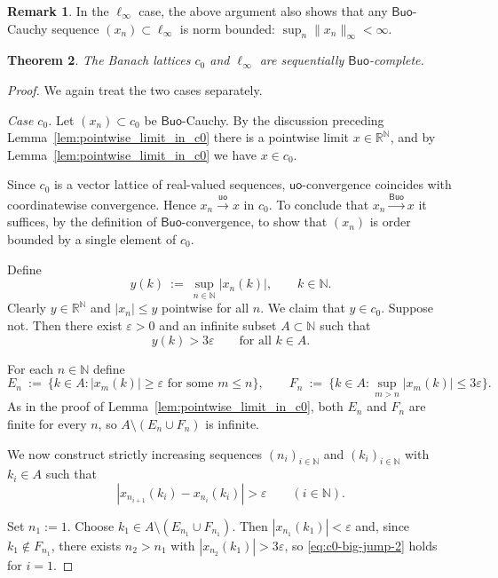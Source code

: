 \documentclass[11pt]{amsart}
\newtheorem{theorem}{Theorem}[section]
\theoremstyle{definition}
\newtheorem{remark}[theorem]{Remark}
\newcommand{\R}{\mathbb{R}}
\newcommand{\N}{\mathbb{N}}
\newcommand{\uo}{\ensuremath{\mathsf{uo}}}
\newcommand{\Buo}{\ensuremath{\mathsf{Buo}}}
\renewcommand{\le}{\leqslant}
\renewcommand{\ge}{\geqslant}
\begin{document}
\begin{remark}
In the $\ell_\infty$ case, the above argument also shows that any
\Buo-Cauchy sequence $(x_n)\subset\ell_\infty$ is norm bounded:
$\sup_n\|x_n\|_\infty<\infty$.
\end{remark}

\begin{theorem}\label{thm:c0-complete}
The Banach lattices $c_0$ and $\ell_\infty$ are sequentially \Buo-complete.
\end{theorem}

\begin{proof}
We again treat the two cases separately.

\emph{Case $c_0$.}
Let $(x_n)\subset c_0$ be \Buo-Cauchy.  By the discussion preceding
Lemma~\ref{lem:pointwise_limit_in_c0} there is a pointwise limit
$x\in\R^\N$, and by Lemma~\ref{lem:pointwise_limit_in_c0} we have $x\in c_0$.

Since $c_0$ is a vector lattice of real-valued sequences, $\uo$-convergence
coincides with coordinatewise convergence.  Hence $x_n\xrightarrow{\uo}x$
in $c_0$.  To conclude that $x_n\xrightarrow{\Buo}x$ it suffices, by the
definition of \Buo-convergence, to show that $(x_n)$ is order bounded by a
single element of $c_0$.

Define
\[
y(k)\ :=\ \sup_{n\in\N}|x_n(k)|,\qquad k\in\N.
\]
Clearly $y\in\R^\N$ and $|x_n|\le y$ pointwise for all $n$.  We claim that
$y\in c_0$.  Suppose not.  Then there exist $\varepsilon>0$ and an infinite
subset $A\subset\N$ such that
\[
y(k)>3\varepsilon\qquad\text{for all }k\in A.
\]

For each $n\in\N$ define
\[
E_n\ :=\ \bigl\{k\in A: |x_m(k)|\ge\varepsilon \text{ for some } m\le n\bigr\},
\qquad
F_n\ :=\ \bigl\{k\in A: \sup_{m>n}|x_m(k)|\le 3\varepsilon\bigr\}.
\]
As in the proof of Lemma~\ref{lem:pointwise_limit_in_c0}, both $E_n$ and
$F_n$ are finite for every $n$, so $A\setminus(E_n\cup F_n)$ is infinite.

We now construct strictly increasing sequences $(n_i)_{i\in\N}$ and $(k_i)_{i\in\N}$
with $k_i\in A$ such that
\begin{equation}\label{eq:c0-big-jump-2}
|x_{n_{i+1}}(k_i)-x_{n_i}(k_i)|>\varepsilon\qquad(i\in\N).
\end{equation}

Set $n_1:=1$. Choose $k_1\in A\setminus(E_{n_1}\cup F_{n_1})$.
Then $|x_{n_1}(k_1)|<\varepsilon$ and, since $k_1\notin F_{n_1}$,
there exists $n_2>n_1$ with $|x_{n_2}(k_1)|>3\varepsilon$, so
\eqref{eq:c0-big-jump-2} holds for $i=1$.


\end{proof}
\end{document}

